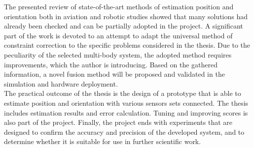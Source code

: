 The presented review of state-of-the-art methods of estimation position and orientation both in aviation and robotic studies showed that many solutions had already been checked and can be partially adopted in the project. A significant part of the work is devoted to an attempt to adapt the universal method of constraint correction to the specific problems considered in the thesis. Due to the peculiarity of the selected multi-body system, the adopted method requires improvements, which the author is introducing. Based on the gathered information, a novel fusion method will be proposed and validated in the simulation and hardware deployment.\\

The practical outcome of the thesis is the design of a prototype that is able to estimate position and orientation with various sensors sets connected. The thesis includes estimation results and error calculation. Tuning and improving scores is also part of the project. Finally, the project ends with experiments that are designed to confirm the accuracy and precision of the developed system, and to determine whether it is suitable for use in further scientific work. 